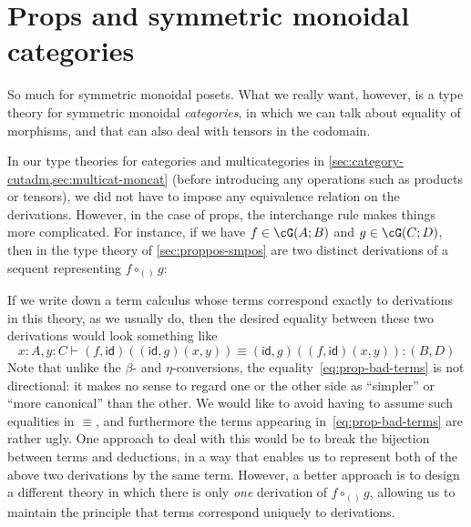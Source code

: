 \documentclass{book}
\def\idfunc{\mathsf{id}}
\let\types\vdash
\begin{document}
\section{Props and symmetric monoidal categories}
\label{sec:prop-smc}

So much for symmetric monoidal posets.
What we really want, however, is a type theory for symmetric monoidal \emph{categories}, in which we can talk about equality of morphisms, and that can also deal with tensors in the codomain.

In our type theories for categories and multicategories in \cref{sec:category-cutadm,sec:multicat-moncat} (before introducing any operations such as products or tensors), we did not have to impose any equivalence relation on the derivations.
However, in the case of props, the interchange rule makes things more complicated.
For instance, if we have $f\in \cG(A;B)$ and $g\in\cG(C;D)$, then in the type theory of \cref{sec:proppos-smpos} are two distinct derivations of a sequent representing $f\circ_{()} g$:
If we write down a term calculus whose terms correspond exactly to derivations in this theory, as we usually do, then the desired equality between these two derivations would look something like
\begin{equation}
  x:A, y:C \types (f,\idfunc)((\idfunc,g)(x,y)) \equiv (\idfunc,g)((f,\idfunc)(x,y)) : (B,D)\label{eq:prop-bad-terms}
\end{equation}
Note that unlike the $\beta$- and $\eta$-conversions, the equality~\eqref{eq:prop-bad-terms} is not directional: it makes no sense to regard one or the other side as ``simpler'' or ``more canonical'' than the other.
We would like to avoid having to assume such equalities in $\equiv$, and furthermore the terms appearing in~\eqref{eq:prop-bad-terms} are rather ugly.
One approach to deal with this would be to break the bijection between terms and deductions, in a way that enables us to represent both of the above two derivations by the same term.
However, a better approach is to design a different theory in which there is only \emph{one} derivation of $f\circ_{()} g$, allowing us to maintain the principle that terms correspond uniquely to derivations.
\end{document}
